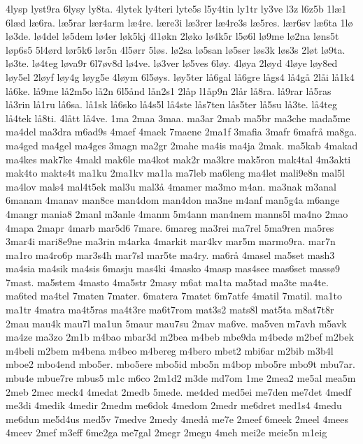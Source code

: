 4lysp
lyst9ra
6lysy
ly8ta.
4lytek
ly4teri
lyte5s
l5y4tin
ly1tr
ly3ve
l3z
l6z5b
1l^^e61
6l^^e6d
l^^e66ra.
l^^e65rar
l^^e6r4arm
l^^e64re.
l^^e6re3i
l^^e63rer
l^^e64re3s
l^^e65res.
l^^e6r6sv
l^^e66ta
1l^^f8
l^^f83de.
l^^f84del
l^^f85dem
l^^f84er
l^^f8k5kj
4l1^^f8kn
2l^^f8ko
l^^f84k5r
l5^^f86l
l^^f89me
l^^f82na
l^^f8ns5t
l^^f8p6s5
5l4^^f8rd
l^^f8r5k6
l^^f8r5n
4l5^^f8rr
5l^^f8s.
l^^f82sa
l^^f85san
l^^f85ser
l^^f8s3k
l^^f8s3s
2l^^f8t
l^^f89ta.
l^^f83te.
l^^f84teg
l^^f8va9r
6l7^^f8v8d
l^^f84ve.
l^^f83ver
l^^f85ves
6l^^f8y.
4l^^f8ya
2l^^f8yd
4l^^f8ye
l^^f8y8ed
l^^f8y5el
2l^^f8yf
l^^f8y4g
l^^f8yg5e
4l^^f8ym
6l5^^f8ys.
l^^f8y5ter
l^^e56gal
l^^e56gre
l^^e5gs4
l^^e54g^^e5
2l^^e5i
l^^e51k4
l^^e56ke.
l^^e59me
l^^e52m5o
l^^e52n
6l5^^e5nd
l^^e5n2s1
2l^^e5p
l1^^e5p9n
2l^^e5r
l^^e58ra.
l^^e59rar
l^^e55ras
l^^e53rin
l^^e51ru
l^^e56sa.
l^^e51sk
l^^e56sko
l^^e54s5l
l^^e54ste
l^^e5s7ten
l^^e5s5ter
l^^e55su
l^^e53te.
l^^e54teg
l^^e54tek
l^^e58ti.
4l^^e5tt
l^^e54ve.
1ma
2maa
3maa.
ma3ar
2mab
ma5br
ma3che
mada5me
ma4del
ma3dra
m6ad9s
4maef
4maek
7maene
2ma1f
3mafia
3mafr
6mafr^^e5
ma8ga.
ma4ged
ma4gel
ma4ges
3magn
ma2gr
2mahe
ma4is
ma4ja
2mak.
ma5kab
4makad
ma4kes
mak7ke
4makl
mak6le
ma4kot
mak2r
ma3kre
mak5ron
mak4tal
4m3akti
mak4to
makts4t
ma1ku
2ma1kv
ma1la
ma7leb
ma6leng
ma4let
mali9e8n
mal5l
ma4lov
mals4
mal4t5ek
mal3u
mal3^^e5
4mamer
ma3mo
m4an.
ma3nak
m3anal
6manam
4manav
man8ce
man4dom
man4don
ma3ne
m4anf
man5g4a
m6ange
4mangr
mania8
2manl
m3anle
4manm
5m4ann
man4nem
manns5l
ma4no
2mao
4mapa
2mapr
4marb
mar5d6
7mare.
6mareg
ma3rei
ma7rel
5ma9ren
ma5res
3mar4i
mari8e9ne
ma3rin
m4arka
4markit
mar4kv
mar5m
marmo9ra.
mar7n
ma1ro
ma4ro6p
mar3s4h
mar7sl
mar5te
ma4ry.
ma6r^^e5
4masel
ma5set
mash3
ma4sia
ma4sik
ma4sis
6masju
mas4ki
4masko
4masp
mas4see
mas6set
mass^^f89
7mast.
ma5stem
4masto
4ma5str
2masy
m6at
ma1ta
ma5tad
ma3te
ma4te.
ma6ted
ma4tel
7maten
7mater.
6matera
7matet
6m7atfe
4matil
7matil.
ma1to
ma1tr
4matra
ma4t5ras
ma4t3re
ma6t7rom
mat3s2
mats8l
mat5ta
m8at7t8r
2mau
mau4k
mau7l
ma1un
5maur
mau7su
2mav
ma6ve.
ma5ven
m7avh
m5avk
ma4ze
ma3zo
2m1b
m4bao
mbar3d
m2bea
m4beb
mbe9da
m4bed^^f8
m2bef
m2bek
m4beli
m2bem
m4bena
m4beo
m4bereg
m4bero
mbet2
mbi6ar
m2bib
m3b4l
mboe2
mbo4end
mbo5er.
mbo5ere
mbo5id
mbo5n
m4bop
mbo5re
mbo9t
mbu7ar.
mbu4e
mbue7re
mbus5
m1c
m6co
2m1d2
m3de
md7om
1me
2mea2
me5al
mea5m
2meb
2mec
meck4
4medat
2medb
5mede.
me4ded
med5ei
me7den
me7det
4medf
me3di
4medik
4medir
2medm
me6dok
4medom
2medr
me6dret
med1s4
4medu
me6dun
me5d4us
med5v
7medve
2medy
4med^^e5
me7e
2meef
6meek
2meel
4mees
4meev
2mef
m3eff
6me2ga
me7gal
2megr
2megu
4meh
mei2e
meie5n
m1eig
